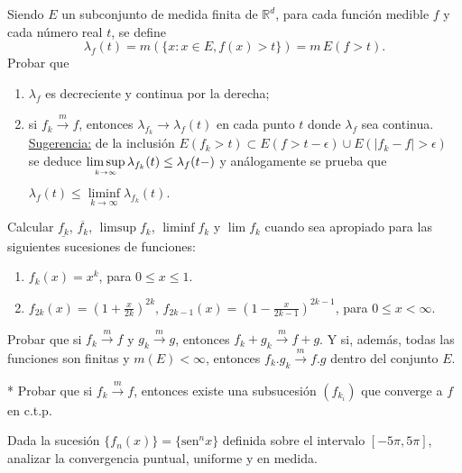 \documentclass{book}
\newcommand{\rr}{\mathbb{R}}
\begin{document}
\begin{ejer}{} 
 Siendo $E$ un subconjunto de medida finita de $\rr^d$,\;  para cada función medible $f$
y cada n\'umero real $t$, se define
$$\lambda_f(t)=m(\{x:x\in E,f(x)>t\})=m\,E(f>t).$$
Probar que 
	\begin{enumerate}
  \item $\lambda_f$ es decreciente y continua por la derecha;
  \item si $f_k \stackrel {m}{\rightarrow}f$, entonces $\lambda_{f_k} \rightarrow \lambda_f(t)$
  en cada punto $t$ donde $\lambda_f$ sea continua.
\\
  \underline{Sugerencia:}
de la inclusión $E(f_k>t)\subset E(f>t-\epsilon)\cup E(|f_k-f|>\epsilon) $
se deduce \;$\limsup\limits_{{k\rightarrow \infty}\atop} \lambda_{f_k}(t)\leq \lambda_{f}(t-)$\; y análogamente se prueba que 
\;$\lambda_f(t)\leq \liminf\limits_{k\rightarrow \infty} \lambda_{f_k}(t).\;$
	\end{enumerate}
\end{ejer}


\begin{ejer}{}
Calcular $\underline{f_k}$, $\overline{f_k}$, $\limsup f_k$, $\liminf f_k$ y $\lim f_k$ cuando sea
apropiado para las siguientes sucesiones de funciones:
\begin{enumerate}
\item
$f_k(x)=x^k$, \; para $0\leq x\leq 1.$
\item $f_{2k}(x)=\left(1+\frac{x}{2k}\right)^{2k}$, $f_{2k-1}(x)=\left(1-\frac{x}{2k-1}\right)^{2k-1}$, \;para $0\leq x<\infty$.
\end{enumerate}
\end{ejer}



\begin{ejer}{} Probar que si $f_k \stackrel{m}{\rightarrow}f$ \;y\; $g_k \stackrel{m}{\rightarrow}g$, entonces \;
$f_k+g_k \stackrel{m}{\rightarrow}f+g$.  
Y si, además, todas las funciones son finitas y $m(E)<\infty$, entonces $f_k.g_k \stackrel{m} \rightarrow f.g$
dentro del conjunto $E$.
\end{ejer}

\begin{ejer}{}* 
Probar que si $f_k \stackrel{m}{\rightarrow}f$, \;entonces existe una subsucesión $(f_{k_i})$ que 
converge a $f$ en c.t.p.
\end{ejer}

\begin{ejer}{} 
Dada la sucesión $\{f_n(x)\}=\{\text{sen}^n x\}$ definida sobre el intervalo $[-5 \pi, 5\pi]$, 
analizar  la convergencia puntual, uniforme y en medida.
\end{ejer}
\end{document}
